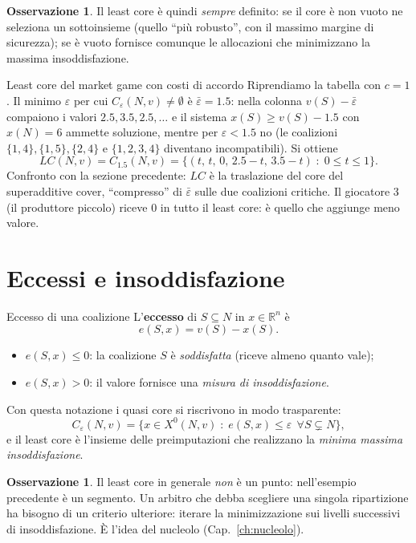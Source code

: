 \documentclass[12pt,a4paper,twoside]{book}
\theoremstyle{plain}
\theoremstyle{definition}
\newtheorem{remark}[theorem]{Osservazione}
\begin{document}
\begin{remark}
Il least core è quindi \emph{sempre} definito: se il core è non vuoto ne
seleziona un sottoinsieme (quello ``più robusto'', con il massimo margine di
sicurezza); se è vuoto fornisce comunque le allocazioni che minimizzano la
massima insoddisfazione.
\end{remark}

\begin{exbox}{Least core del market game con costi di accordo}
Riprendiamo la tabella con $c=1$. Il minimo $\varepsilon$ per cui
$C_{\varepsilon}(N,v)\ne\emptyset$ è $\bar\varepsilon=1.5$: nella colonna
$v(S)-\bar\varepsilon$ compaiono i valori $2.5,3.5,2.5,\dots$ e il sistema
$x(S)\ge v(S)-1.5$ con $x(N)=6$ ammette soluzione, mentre per $\varepsilon<1.5$ no
(le coalizioni $\{1,4\},\{1,5\},\{2,4\}$ e $\{1,2,3,4\}$ diventano incompatibili).
Si ottiene
\[
  LC(N,v)=C_{1.5}(N,v)=\{(t,\,t,\,0,\,2.5-t,\,3.5-t)\;:\;0\le t\le 1\}.
\]
Confronto con la sezione precedente: $LC$ è la traslazione del core del
superadditive cover, ``compresso'' di $\bar\varepsilon$ sulle due coalizioni
critiche. Il giocatore 3 (il produttore piccolo) riceve $0$ in tutto il least
core: è quello che aggiunge meno valore.
\end{exbox}

\section{Eccessi e insoddisfazione}

\begin{defbox}{Eccesso di una coalizione}
L'\textbf{eccesso} di $S\subseteq N$ in $x\in\mathbb{R}^n$ è
\[
  e(S,x)=v(S)-x(S).
\]
\begin{itemize}
  \item $e(S,x)\le 0$: la coalizione $S$ è \emph{soddisfatta} (riceve almeno quanto vale);
  \item $e(S,x)>0$: il valore fornisce una \emph{misura di insoddisfazione}.
\end{itemize}
\end{defbox}

Con questa notazione i quasi core si riscrivono in modo trasparente:
\[
  C_{\varepsilon}(N,v)=\{x\in X^{0}(N,v)\;:\;e(S,x)\le\varepsilon\ \ \forall S\subsetneq N\},
\]
e il least core è l'insieme delle preimputazioni che realizzano la
\emph{minima massima insoddisfazione}.

\begin{remark}
Il least core in generale \emph{non} è un punto: nell'esempio precedente è un
segmento. Un arbitro che debba scegliere una singola ripartizione ha bisogno di
un criterio ulteriore: iterare la minimizzazione sui livelli successivi di
insoddisfazione. È l'idea del nucleolo (Cap.~\ref{ch:nucleolo}).
\end{remark}
\end{document}
